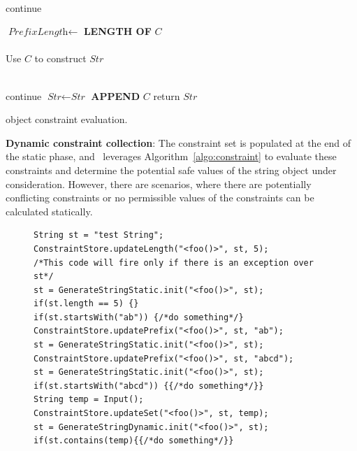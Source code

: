 \begin{mylist}
\begin{algorithm}[t]
{     {
         {\\
          \mytab continue
        }
        
        $\textit{PrefixLength} \longleftarrow$ {\bf LENGTH OF} $C$\\
        
         {\\
          \mytab  Use $C$ to construct $\textit{Str}$
        }
    }

     {
         {\\
          \mytab  continue
        }
        $\textit{Str} \leftarrow \textit{Str}$ {\bf APPEND} $C$
    }
    return $\textit{Str}$
}
\caption{ object constraint evaluation.}
\label{algo:constraint}
\end{algorithm}

 \item \textbf{Dynamic constraint collection}: The constraint set is populated
at the end of the static phase, and \tool\ leverages
Algorithm~\ref{algo:constraint} to evaluate these constraints and determine the
potential safe values of the string object under consideration. However, there
are scenarios, where there are potentially conflicting constraints or no
permissible values of the constraints can be calculated statically.


\begin{figure}[!htb]
\begin{lstlisting}
String st = "test String";
ConstraintStore.updateLength("<foo()>", st, 5);
/*This code will fire only if there is an exception over st*/
st = GenerateStringStatic.init("<foo()>", st);
if(st.length == 5) {}
if(st.startsWith("ab")) {/*do something*/}
ConstraintStore.updatePrefix("<foo()>", st, "ab");
st = GenerateStringStatic.init("<foo()>", st);
ConstraintStore.updatePrefix("<foo()>", st, "abcd");
st = GenerateStringStatic.init("<foo()>", st);
if(st.startsWith("abcd")) {{/*do something*/}}
String temp = Input();
ConstraintStore.updateSet("<foo()>", st, temp);
st = GenerateStringDynamic.init("<foo()>", st);
if(st.contains(temp){{/*do something*/}}
\end{lstlisting}
\end{figure}


\end{mylist}
